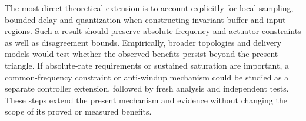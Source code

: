The most direct theoretical extension is to account explicitly for
local sampling, bounded delay and quantization when constructing
invariant buffer and input regions. Such a result should preserve
absolute-frequency and actuator constraints as well as disagreement
bounds. Empirically, broader topologies and delivery models would
test whether the observed benefits persist beyond the present
triangle. If absolute-rate requirements or sustained saturation are
important, a common-frequency constraint or anti-windup mechanism
could be studied as a separate controller extension, followed by
fresh analysis and independent tests. These steps extend the present
mechanism and evidence without changing the scope of its proved or
measured benefits.


